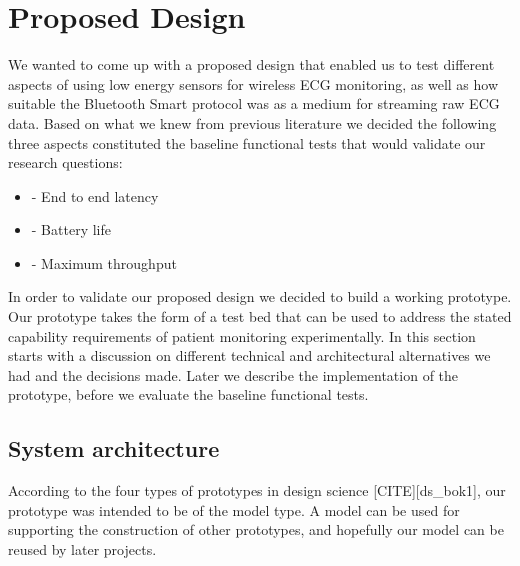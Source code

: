 \section{Proposed Design} 

\label{sec:proposed_design}

We wanted to come up with a proposed design that enabled us to test different aspects of using low energy sensors for wireless ECG monitoring, as well as how suitable the Bluetooth Smart protocol was as a medium for streaming raw ECG data. Based on what we knew from previous literature we decided the following three aspects constituted the baseline functional tests that would validate our research questions:
\begin{itemize}
	
	\item - End to end latency
	
	\item - Battery life
	
	\item - Maximum throughput
\end{itemize}

In order to validate our proposed design we decided to build a working prototype. Our prototype takes the form of a test bed that can be used to address the stated capability requirements of patient monitoring experimentally. In this section starts with a discussion on different technical and architectural alternatives we had and the decisions made. Later we describe the implementation of the prototype, before we evaluate the baseline functional tests.


\subsection{System architecture} %
\label{sub:system_architecture}

According to the four types of prototypes in design science [CITE][ds_bok1], our prototype was intended to be of the model type. A model can be used for supporting the construction of other prototypes, and hopefully our model can be reused by later projects.


